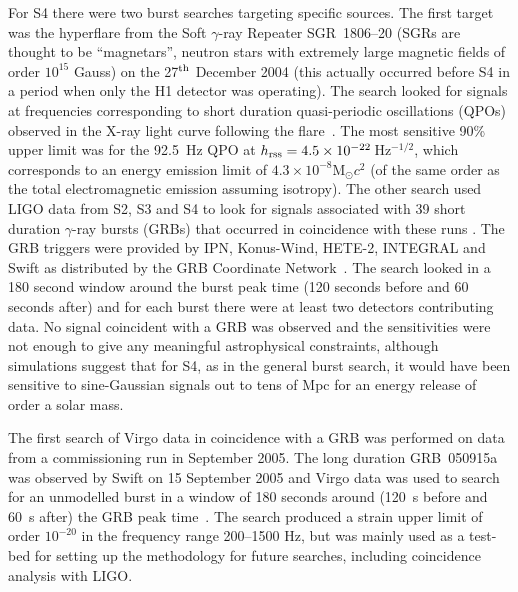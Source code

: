 \documentclass{article}
\begin{document}
For S4 there were two burst searches targeting specific sources. The first
target was the hyperflare from the Soft $\gamma$-ray Repeater SGR~1806--20
(SGRs are thought to be ``magnetars'', neutron stars with extremely large
magnetic fields of order $10^{15}$ Gauss) on the 27$^{\rm th}$ December 2004
\cite{Hurley:2005} (this actually occurred before S4 in a period when only the
H1 detector was operating). The search looked for signals at frequencies
corresponding to short duration quasi-periodic oscillations (QPOs) observed in
the X-ray light curve following the flare~\cite{Abbott:2007c}. The most
sensitive 90\% upper limit was for the 92.5~Hz QPO at $h_{\rm rss} =
4.5\times10^{-22}$\,Hz$^{-1/2}$, which corresponds to an energy emission limit
of $4.3\times10^{-8}$M$_{\odot}c^2$ (of the same order as the total
electromagnetic emission assuming isotropy). The other search used LIGO data
from S2, S3 and S4 to look for signals associated with 39 short duration
$\gamma$-ray bursts (GRBs) that occurred in coincidence with these runs
\cite{Abbott:2008c}. The GRB triggers were provided by IPN, Konus-Wind, HETE-2,
INTEGRAL and Swift as distributed by the GRB Coordinate Network~\cite{GCN}. The
search looked in a 180 second window around the burst peak time (120 seconds
before and 60 seconds after) and for each burst there were at least two
detectors contributing data. No signal coincident with a GRB was observed and
the sensitivities were not enough to give any meaningful astrophysical
constraints, although simulations suggest that for S4, as in the general burst
search, it would have been sensitive to sine-Gaussian signals out to tens of Mpc
for an energy release of order a solar mass.

The first search of Virgo data in coincidence with a GRB was performed on data
from a commissioning run in September 2005. The long duration GRB~050915a was
observed by Swift on 15 September 2005 and Virgo data was used to search for an
unmodelled burst in a window of 180 seconds around (120~s before and 60~s after)
the GRB peak time~\cite{Acernese:2008a}. The search produced a strain upper
limit of order $10^{-20}$ in the frequency range 200--1500 Hz, but was mainly
used as a test-bed for setting up the methodology for future searches, including
coincidence analysis with LIGO.
\end{document}

